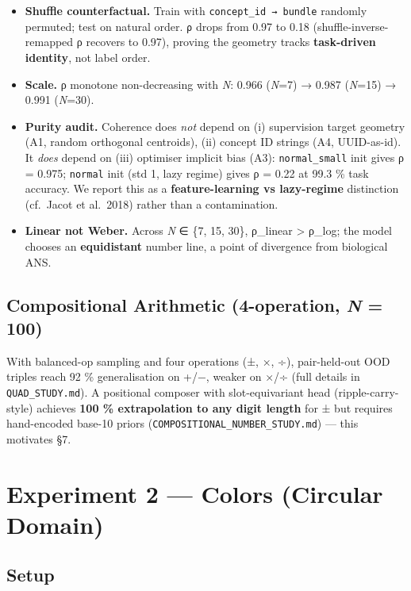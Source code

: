 \begin{itemize}
\tightlist
\item
  \textbf{Shuffle counterfactual.} Train with \texttt{concept\_id\ →\ bundle} randomly
  permuted; test on natural order. \texttt{\textbar{}ρ\textbar{}} drops from 0.97 to 0.18
  (shuffle-inverse-remapped ρ recovers to 0.97), proving the geometry
  tracks \textbf{task-driven identity}, not label order.
\item
  \textbf{Scale.} ρ monotone non-decreasing with \emph{N}: 0.966 (\emph{N}=7) → 0.987
  (\emph{N}=15) → 0.991 (\emph{N}=30).
\item
  \textbf{Purity audit.} Coherence does \emph{not} depend on (i) supervision
  target geometry (A1, random orthogonal centroids), (ii) concept ID
  strings (A4, UUID-as-id). It \emph{does} depend on (iii) optimiser implicit
  bias (A3): \texttt{normal\_small} init gives ρ = 0.975; \texttt{normal} init (std 1,
  lazy regime) gives ρ = 0.22 at 99.3 \% task accuracy. We report this
  as a \textbf{feature-learning vs lazy-regime} distinction (cf.~Jacot et
  al.~2018) rather than a contamination.
\item
  \textbf{Linear not Weber.} Across \emph{N} ∈ \{7, 15, 30\}, ρ\_linear \textgreater{} ρ\_log; the
  model chooses an \textbf{equidistant} number line, a point of divergence
  from biological ANS.
\end{itemize}

\subsection{\texorpdfstring{Compositional Arithmetic (4-operation, \emph{N} = 100)}{Compositional Arithmetic (4-operation, N = 100)}}

With balanced-op sampling and four operations (±, ×, ÷), pair-held-out
OOD triples reach 92 \% generalisation on +/−, weaker on ×/÷ (full
details in \texttt{QUAD\_STUDY.md}). A positional composer with slot-equivariant
head (ripple-carry-style) achieves \textbf{100 \% extrapolation to any digit
length} for ± but requires hand-encoded base-10 priors
(\texttt{COMPOSITIONAL\_NUMBER\_STUDY.md}) --- this motivates §7.

\medskip

\section{Experiment 2 --- Colors (Circular Domain)}

\subsection{Setup}

